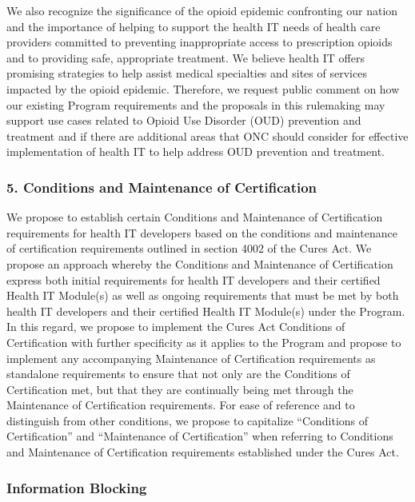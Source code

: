 \documentclass[twoside,11pt]{article}
\begin{document}
          We also recognize the significance of the opioid epidemic confronting our nation and the importance of helping to support the health IT needs of health care providers committed to preventing inappropriate access to prescription opioids and to providing safe, appropriate treatment. We believe health IT offers promising strategies to help assist medical specialties and sites of services impacted by the opioid epidemic. Therefore, we request public comment on how our existing Program requirements and the proposals in this rulemaking may support use cases related to Opioid Use Disorder (OUD) prevention and treatment and if there are additional areas that ONC should consider for effective implementation of health IT to help address OUD prevention and treatment.


          \subsubsection{5. Conditions and Maintenance of Certification}


          We propose to establish certain Conditions and Maintenance of Certification requirements for health IT developers based on the conditions and maintenance of certification requirements outlined in section 4002 of the Cures Act. We propose an approach whereby the Conditions and Maintenance of Certification express both initial requirements for health IT developers and their certified Health IT Module(s) as well as ongoing requirements that must be met by both health IT developers and their certified Health IT Module(s) under the Program. In this regard, we propose to implement the Cures Act Conditions of Certification with further specificity as it applies to the Program and propose to implement any accompanying Maintenance of Certification requirements as standalone requirements to ensure that not only are the Conditions of Certification met, but that they are continually being met through the Maintenance of Certification requirements. For ease of reference and to distinguish from other conditions, we propose to capitalize “Conditions of Certification” and “Maintenance of Certification” when referring to Conditions and Maintenance  \ifhmode\expandafter\xspace\fi of Certification requirements established under the Cures Act.


          \subsubsection{Information Blocking}
\end{document}
